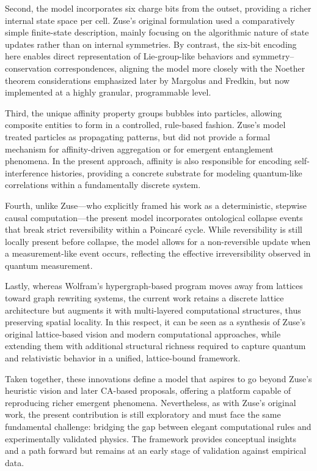 \documentclass[12pt]{article}
\begin{document}
Second, the model incorporates six charge bits from the outset, providing a richer internal state space per cell. Zuse’s original formulation used a comparatively simple finite-state description, mainly focusing on the algorithmic nature of state updates rather than on internal symmetries. By contrast, the six-bit encoding here enables direct representation of Lie-group-like behaviors and symmetry–conservation correspondences, aligning the model more closely with the Noether theorem considerations emphasized later by Margolus and Fredkin, but now implemented at a highly granular, programmable level.

Third, the unique affinity property groups bubbles into particles, allowing composite entities to form in a controlled, rule-based fashion. Zuse’s model treated particles as propagating patterns, but did not provide a formal mechanism for affinity-driven aggregation or for emergent entanglement phenomena. In the present approach, affinity is also responsible for encoding self-interference histories, providing a concrete substrate for modeling quantum-like correlations within a fundamentally discrete system.

Fourth, unlike Zuse—who explicitly framed his work as a deterministic, stepwise causal computation—the present model incorporates ontological collapse events that break strict reversibility within a Poincaré cycle. While reversibility is still locally present before collapse, the model allows for a non-reversible update when a measurement-like event occurs, reflecting the effective irreversibility observed in quantum measurement.

Lastly, whereas Wolfram’s hypergraph-based program moves away from lattices toward graph rewriting systems, the current work retains a discrete lattice architecture but augments it with multi-layered computational structures, thus preserving spatial locality. In this respect, it can be seen as a synthesis of Zuse’s original lattice-based vision and modern computational approaches, while extending them with additional structural richness required to capture quantum and relativistic behavior in a unified, lattice-bound framework.

Taken together, these innovations define a model that aspires to go beyond Zuse’s heuristic vision and later CA-based proposals, offering a platform capable of reproducing richer emergent phenomena. Nevertheless, as with Zuse’s original work, the present contribution is still exploratory and must face the same fundamental challenge: bridging the gap between elegant computational rules and experimentally validated physics. The framework provides conceptual insights and a path forward but remains at an early stage of validation against empirical data.
\end{document}
